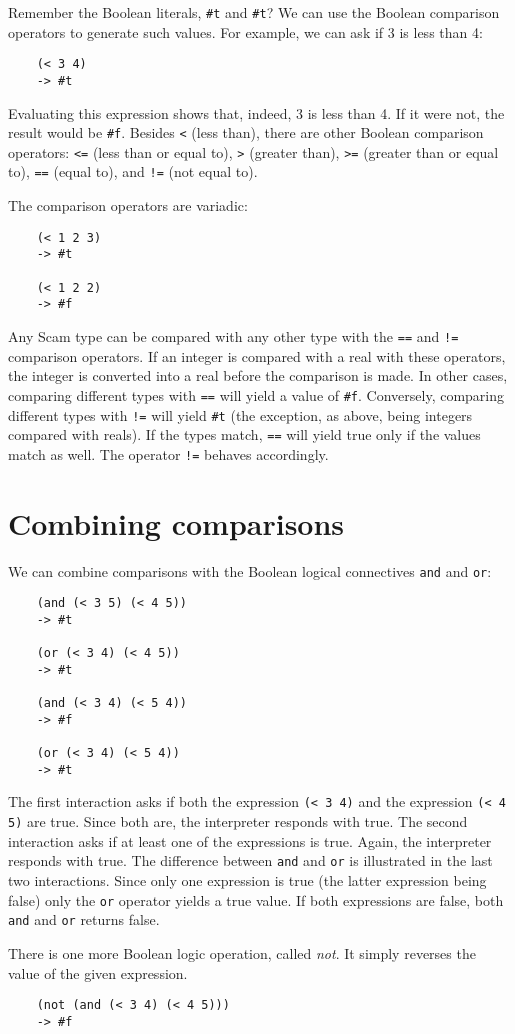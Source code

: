 Remember the {\sc Boolean} literals, {\tt \#t} and {\tt \#t}?
We can use the {\sc Boolean}
comparison operators to generate such values. For example, we can ask
if 3 is less than 4:

\begin{verbatim}
    (< 3 4)
    -> #t
\end{verbatim}

Evaluating this expression shows that, indeed, 3 is less than 4. If it were
not, the result would be {\tt \#f}.
Besides
{\tt <}
(less than),
there are other {\sc Boolean} comparison operators:
{\tt <=}
(less than or equal to),
{\tt >}
(greater than),
{\tt >=}
(greater than or equal to),
{\tt ==}
(equal to), and
{\tt !=}
(not equal to).

The comparison operators are variadic:

\begin{verbatim}
    (< 1 2 3)
    -> #t

    (< 1 2 2)
    -> #f
\end{verbatim}

Any Scam type can be compared with any other type with the
{\tt ==}
and
{\tt !=}
comparison operators.
If an integer is compared with a real with these
operators, the integer is converted into a real before the comparison
is made. In other cases, comparing different types with
{\tt ==}
will yield
a value of {\tt \#f}. Conversely, comparing different types with
{\tt !=}
will yield
{\tt \#t}
(the exception, as above, being integers compared with reals).
If the types match,
{\tt ==}
will yield true only if the values
match as well. The operator
{\tt !=}
behaves accordingly.

\section{Combining comparisons}

We can combine comparisons with the {\sc Boolean} logical connectives
{\tt and} and {\tt or}:

\begin{verbatim}
    (and (< 3 5) (< 4 5))
    -> #t
    
    (or (< 3 4) (< 4 5))
    -> #t
    
    (and (< 3 4) (< 5 4))
    -> #f
    
    (or (< 3 4) (< 5 4))
    -> #t
\end{verbatim}

The first interaction asks if both the expression
{\tt (< 3 4)} and the expression
{\tt (< 4 5)} are true. Since both are, the
interpreter responds with true. The second interaction
asks if at least one of the expressions is true. Again, the
interpreter responds with true. The difference between {\tt and}
and {\tt or} is illustrated in the last two interactions. Since
only one expression is true (the latter expression being
false) only the {\tt or} operator yields a true value.
If both expressions are false, both \verb!and! and \verb!or! returns false.

There is one more {\sc Boolean} logic operation, called
{\it not}. It simply reverses the value of the given expression.

\begin{verbatim}
    (not (and (< 3 4) (< 4 5)))
    -> #f
\end{verbatim}

